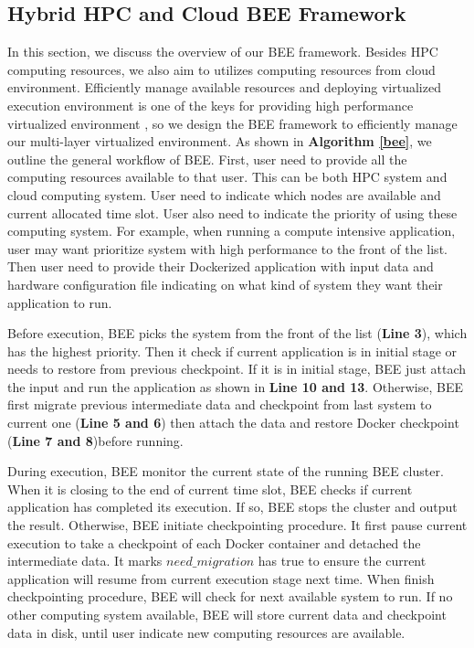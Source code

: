 \subsection{Hybrid HPC and Cloud BEE Framework}

In this section, we discuss the overview of our BEE framework. Besides HPC computing resources, we also aim to utilizes computing resources from cloud environment. Efficiently manage available resources and deploying virtualized execution environment is one of the keys for providing high performance virtualized environment \cite{huang2006case, mateescu2011hybrid}, so we design the BEE framework to efficiently manage our multi-layer virtualized environment.  As shown in \textbf{Algorithm \ref{bee}}, we outline the general workflow of BEE. First, user need to provide all the computing resources available to that user. This can be both HPC system and cloud computing system. User need to indicate which nodes are available and current allocated time slot. User also need to indicate the priority of using these computing system. For example, when running a compute intensive application, user may want prioritize system with high performance to the front of the list. Then user need to provide their Dockerized application with input data and hardware configuration file indicating on what kind of system they want their application to run. 

Before execution, BEE picks the system from the front of the list (\textbf{Line 3}), which has the highest priority. Then it check if current application is in initial stage or needs to restore from previous checkpoint. If it is in initial stage, BEE just attach the input and run the application as shown in \textbf{Line 10 and 13}. Otherwise, BEE first migrate previous intermediate data and checkpoint from last system to current one (\textbf{Line 5 and 6}) then attach the data and restore Docker checkpoint (\textbf{Line 7 and 8})before running. 

During execution, BEE monitor the current state of the running BEE cluster. When it is closing to the end of current time slot, BEE checks if current application has completed its execution. If so, BEE stops the cluster and output the result. Otherwise, BEE initiate checkpointing procedure. It first pause current execution to take a checkpoint of each Docker container and detached the intermediate data. It marks $need\_migration$ has true to ensure the current application will resume from current execution stage next time. When finish checkpointing procedure, BEE will check for next available system to run. If no other computing system available, BEE will store current data and checkpoint data in disk, until user indicate new computing resources are available.
	

